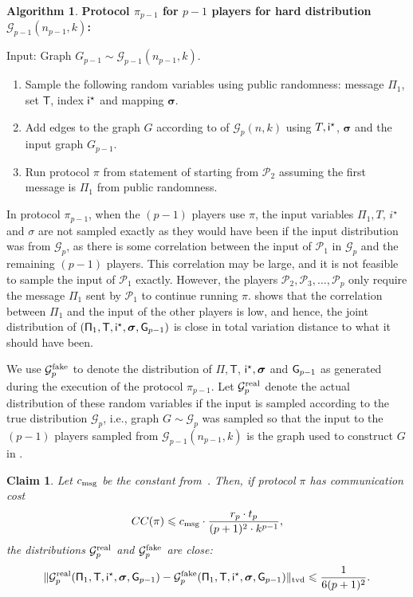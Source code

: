 \documentclass[11pt]{article}
\newtheorem{claim}[lemma]{Claim}
\theoremstyle{definition}
\newenvironment{ourbox}{\begin{mdframed}[hidealllines=false,innerleftmargin=10pt,backgroundcolor=white!10,innertopmargin=5pt,innerbottommargin=5pt,roundcorner=10pt]}{\end{mdframed}}
\newtheorem{mdalgorithm}{Algorithm}
\newenvironment{Algorithm}{\begin{ourbox}\begin{mdalgorithm}}{\end{mdalgorithm}\end{ourbox}}
\renewcommand{\leq}{\leqslant}
\newcommand{\tvd}[2]{\ensuremath{\norm{#1 - #2}_{\mathrm{tvd}}}}
\newcommand{\norm}[1]{\ensuremath{\|#1\|}}
\newcommand{\rv}[1]{\ensuremath{{\mathsf{#1}}}\xspace}
\newcommand{\player}[1]{\ensuremath{\mathcal{P}_{#1}}}
\newcommand{\cG}{\ensuremath{\mathcal{G}}}
\newcommand{\istar}{\ensuremath{i^{\star}}}
\newcommand{\prot}{\ensuremath{\pi}}
\newcommand{\Prot}{\ensuremath{\Pi}}
\newcommand{\rProt}{\ensuremath{\rv{\Prot}}}
\newcommand{\rT}{\ensuremath{\rv{T}}}
\newcommand{\rsigma}{\ensuremath{\bm{\sigma}}}
\begin{document}
	
	\begin{Algorithm}
	\textbf{Protocol $\prot_{p-1}$ for $p-1$ players for hard distribution $\cG_{p-1}(n_{p-1}, k)$:}

		Input: Graph $G_{p-1} \sim \cG_{p-1}(n_{p-1}, k)$.
		\begin{enumerate}[label=$(\roman*)$]
			\item Sample the following random variables using public randomness: message $\rProt_1$, set $\rT$, index $\ristar$ and mapping $\rsigma$. 
			\item Add edges to the graph $G $ according to  of $\cG_p(n,k)$ using $T, \ristar$, $\rsigma$ and the input graph $G_{p-1}$. 
			\item Run protocol $\prot$ from statement of  starting from $\player{2}$ assuming the first message is $\Prot_1$ from public randomness. 
		\end{enumerate}
	\end{Algorithm}
	
	In protocol $\prot_{p-1}$, when the $(p-1)$ players use $\prot$, the input variables  $\Prot_1, T$, $\istar$ and $\sigma$ are not sampled exactly as they would have been if the input distribution was from $\cG_p$, as there is some correlation between the input of $\player{1}$ in $\cG_p$ and the remaining $(p-1)$ players. This correlation may be large, and it is not feasible to sample the input of $\player{1}$ exactly. However, the players $\player{2}, \player{3}, \ldots, \player{p}$ only require the message $\Prot_1$ sent by $\player{1}$ to continue running $\prot$.  shows that the correlation between $\Prot_1$ and the input of the other players is low, and hence, the joint distribution of $(\rProt_1, \rT, \ristar, \rsigma, \rG_{p-1})$ is close in total variation distance to what it should have been. 

	We use $\mathcal{G}^{\textnormal{fake}}_p$ to denote the distribution of $\rProt, \rT$, $\ristar, \rsigma$ and $\rG_{p-1}$ as generated during the execution of the protocol $\prot_{p-1}$. Let $\mathcal{G}^{\textnormal{real}}_p$ denote the actual distribution of these random variables if the input is sampled according to the true distribution $\cG_p$, i.e., graph $G \sim \cG_p$ was sampled so that the input to the $(p-1)$ players sampled from $\cG_{p-1}(n_{p-1},k)$ is the graph used to construct $G$ in .


	\begin{claim}\label{clm:dist-close-fake}
		Let $c_{\textnormal{msg}}$ be the constant from~. Then, if protocol $\prot$ has communication cost
		\[
		CC(\prot) \leq \cmsg \cdot \frac{r_p \cdot t_p}{(p+1)^2 \cdot k^{p-1}},
		\]
		the distributions $\mathcal{G}^{\textnormal{real}}_p$ and $\mathcal{G}^{\textnormal{fake}}_p$ are close:
		\[
		\tvd{\cGreal_p(\rProt_1, \rT, \ristar, \rsigma, \rG_{p-1})}{\cGfake_p( \rProt_1, \rT, \ristar, \rsigma, \rG_{p-1})} \leq \frac1{6(p+1)^2}. 	
		\]
	\end{claim}
	
\end{document}

